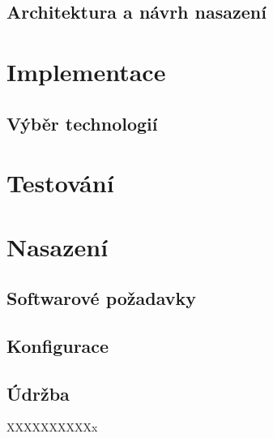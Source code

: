 \documentclass[thesis=B,czech]{FITthesis}[2012/06/26]
\begin{document}
\section{Architektura a návrh nasazení}


\chapter{Implementace}

\section{Výběr technologií}



\chapter{Testování}


\chapter{Nasazení}


\section{Softwarové požadavky}

\section{Konfigurace}

\section{Údržba}

XXXXXXXXXXx \cite{JJ92}

\end{document}
